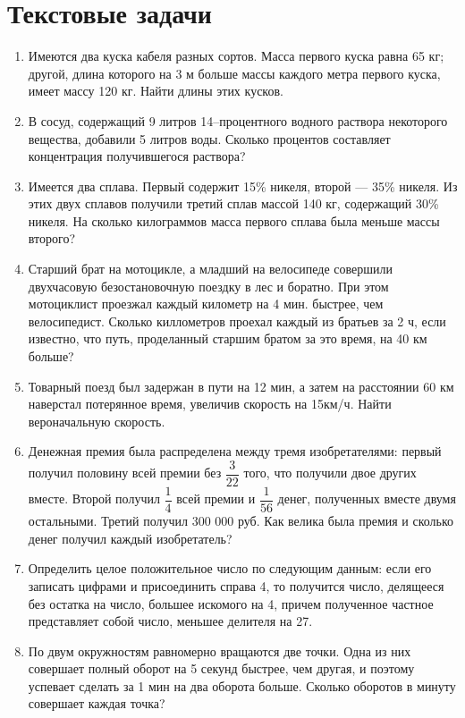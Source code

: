 \documentclass[12pt, a4paper]{article}
\begin{document}
		
	
	\section*{Текстовые задачи}
		\begin{enumerate}
			\item Имеются два куска кабеля разных сортов. Масса первого куска равна 65 кг; другой, длина которого на 3 м больше массы каждого метра первого куска, имеет массу 120 кг. Найти длины этих кусков.
			\item В сосуд, содержащий 9 литров 14–процентного водного раствора некоторого вещества, добавили 5 литров воды. Сколько процентов составляет концентрация получившегося раствора?
			\item Имеется два сплава. Первый содержит 15\% никеля, второй — 35\% никеля. Из этих двух сплавов получили третий сплав массой 140 кг, содержащий 30\% никеля. На сколько килограммов масса первого сплава была меньше массы второго?
			\item Старший брат на мотоцикле, а младший на велосипеде совершили двухчасовую безостановочную поездку в лес и боратно. При этом мотоциклист проезжал каждый километр на 4 мин. быстрее, чем велосипедист. Сколько киллометров проехал каждый из братьев за 2 ч, если известно, что путь, проделанный старшим братом за это время, на 40 км больше?
			\item Товарный поезд был задержан в пути на 12 мин, а затем на расстоянии 60 км наверстал потерянное время, увеличив скорость на 15км/ч. Найти вероначальную скорость.
			\item Денежная премия была распределена между тремя изобретателями: первый получил половину всей премии без $\dfrac{3}{22}$ того, что получили двое других вместе. Второй получил $\dfrac{1}{4}$ всей премии и $\dfrac{1}{56}$ денег, полученных вместе двумя остальными. Третий получил 300 000 руб. Как велика была премия и сколько денег получил каждый изобретатель?
			\item Определить целое положительное число по следующим данным: если его записать цифрами и присоединить справа 4, то получится число, делящееся без остатка на число, большее искомого на 4, причем полученное частное представляет собой число, меньшее делителя на 27.
			\item По двум окружностям равномерно вращаются две точки. Одна из них совершает полный оборот на 5 секунд быстрее, чем другая, и поэтому успевает сделать за 1 мин на два оборота больше. Сколько оборотов в минуту совершает каждая точка?

\end{enumerate}
\end{document}
